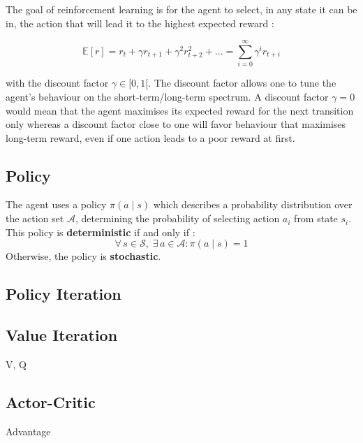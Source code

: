 The goal of reinforcement learning is for the agent to select, in any state it
can be in, the action that will lead it to the highest expected reward :

\begin{equation}
\mathbb{E}[r] = r_t + \gamma r_{t+1} + \gamma^2 r_{t+2}^2 + ... =
 \sum\limits_{i=0}^\infty \gamma^i r_{t+i}
\end{equation}

\noindent with the discount factor  $\gamma \in [0, 1[$.
The discount factor allows one to tune the agent's behaviour on the
short-term/long-term spectrum. A discount factor $\gamma=0$ would mean that the
agent maximises its expected reward for the next transition only whereas a
discount factor close to one will favor behaviour that maximises long-term
reward, even if one action leads to a poor reward at first.\\

\subsection{Policy}
The agent uses a policy $\pi(a \mid s)$ which describes a probability
distribution over the action set $\mathcal{A}$, determining the probability of
selecting action $a_i$ from state $s_i$. This policy is 
\textbf{deterministic} if and only if :
\begin{equation}
\forall\, s \in \mathcal{S},\; \exists\, a \in \mathcal{A} : \pi(a \mid s) = 1
\end{equation}
\noindent Otherwise, the policy is \textbf{stochastic}.


\subsection{Policy Iteration}

\subsection{Value Iteration}
V, Q

\subsection{Actor-Critic}


Advantage

